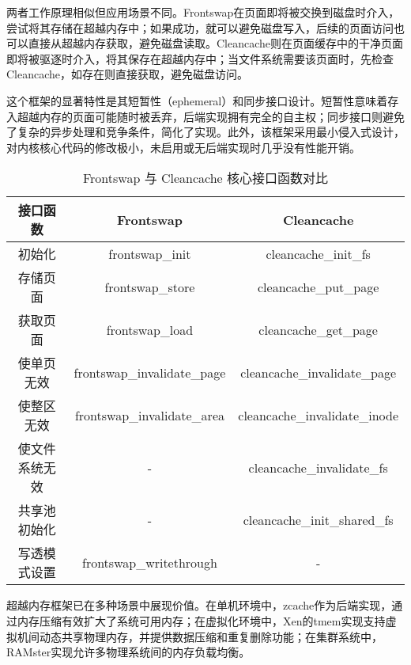 两者工作原理相似但应用场景不同。Frontswap在页面即将被交换到磁盘时介入，尝试将其存储在超越内存中；如果成功，就可以避免磁盘写入，后续的页面访问也可以直接从超越内存获取，避免磁盘读取。Cleancache则在页面缓存中的干净页面即将被驱逐时介入，将其保存在超越内存中；当文件系统需要该页面时，先检查Cleancache，如存在则直接获取，避免磁盘访问。

这个框架的显著特性是其短暂性（ephemeral）和同步接口设计。短暂性意味着存入超越内存的页面可能随时被丢弃，后端实现拥有完全的自主权；同步接口则避免了复杂的异步处理和竞争条件，简化了实现。此外，该框架采用最小侵入式设计，对内核核心代码的修改极小，未启用或无后端实现时几乎没有性能开销。



\begin{table}[htbp]
    \caption{Frontswap 与 Cleancache 核心接口函数对比}
    \begin{tabularx}{\textwidth}{ccc} %
    \toprule
    \textbf{接口函数} & \textbf{Frontswap} & \textbf{Cleancache} \\
    \midrule
    初始化 & frontswap\_init & cleancache\_init\_fs \\
    
    存储页面 & frontswap\_store & cleancache\_put\_page \\
    
    获取页面 & frontswap\_load & cleancache\_get\_page \\
    
    使单页无效 & frontswap\_invalidate\_page & cleancache\_invalidate\_page \\
    
    使整区无效 & frontswap\_invalidate\_area & cleancache\_invalidate\_inode \\
    
    使文件系统无效 & - & cleancache\_invalidate\_fs \\
    
    共享池初始化 & - & cleancache\_init\_shared\_fs \\
    
    写透模式设置 & frontswap\_writethrough & - \\
    \bottomrule
    \end{tabularx}
    \end{table}


超越内存框架已在多种场景中展现价值。在单机环境中，zcache作为后端实现，通过内存压缩有效扩大了系统可用内存；在虚拟化环境中，Xen的tmem实现支持虚拟机间动态共享物理内存，并提供数据压缩和重复删除功能；在集群系统中，RAMster实现允许多物理系统间的内存负载均衡。

